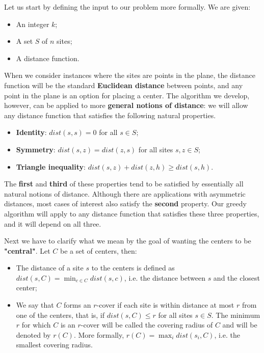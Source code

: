 
Let us start by defining the input to our problem more formally. We are given:
\begin{itemize}
    \item An integer $k$;
    \item A set $S$ of $n$ sites;
    \item A distance function.
\end{itemize}  

When we consider instances where the sites are points in the plane, the distance function will be the standard \textbf{Euclidean distance} between points, and any point in the plane is an option for placing a center. The algorithm we develop, however, can be applied to more \textbf{general notions of distance}: we will allow any distance function that satisfies the following natural properties.
\begin{itemize}
    \item \textbf{Identity}: $dist(s, s) = 0$ for all $s \in S$;
    \item \textbf{Symmetry}: $dist(s, z) = dist(z, s)$ for all sites $s, z \in S$;
    \item \textbf{Triangle inequality}: $dist(s, z) + dist(z, h) \geq dist(s, h)$.
\end{itemize}

The \textbf{first} and \textbf{third} of these properties tend to be satisfied by essentially all natural notions of distance. Although there are applications with asymmetric distances, most cases of interest also satisfy the \textbf{second} property. Our greedy algorithm will apply to any distance function that satisfies these three properties, and it will depend on all three.

Next we have to clarify what we mean by the goal of wanting the centers to be \textbf{"central"}. Let $C$ be a set of centers, then:

\begin{itemize}
    \item The distance of a site $s$ to the centers is defined as $dist(s, C) = \min_{c \in C} dist(s, c)$, i.e. the distance between $s$ and the closest center;
    \item We say that $C$ forms an $r$-cover if each site is within distance at most $r$ from one of the centers, that is, if $dist(s, C) \leq r$ for all sites $s \in S$. The minimum $r$ for which $C$ is an $r$-cover will be called the covering radius of $C$ and will be denoted by $r(C)$. More formally, $r(C) = \max_{i} dist(s_i,C)$, i.e. the smallest covering radius.
\end{itemize}

